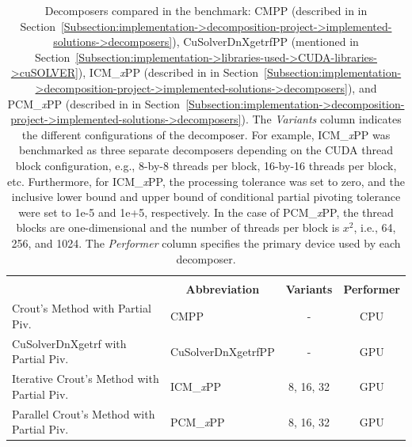 \begin{table}[ht!]
	\centering
	\begin{tabular}{|ll|c|c|}
		\hline
		\rowcolor[HTML]{C0C0C0} 
		\multicolumn{2}{|c|}{\cellcolor[HTML]{C0C0C0}\textbf{Decomposer}} & \cellcolor[HTML]{C0C0C0} & \multicolumn{1}{c|}{\cellcolor[HTML]{C0C0C0}} \\
		\rowcolor[HTML]{EFEFEF} 
		\multicolumn{1}{|c|}{\cellcolor[HTML]{EFEFEF}\textbf{Name}} & \multicolumn{1}{c|}{\cellcolor[HTML]{EFEFEF}\textbf{Abbreviation}} & \multirow{-2}{*}{\cellcolor[HTML]{C0C0C0}\textbf{Variants}} & \multicolumn{1}{c|}{\multirow{-2}{*}{\cellcolor[HTML]{C0C0C0}\textbf{Performer}}} \\ \hline
		\multicolumn{1}{|l|}{Crout's Method with Partial Piv.}           & CMPP               &     -     & CPU \\
		\multicolumn{1}{|l|}{CuSolverDnXgetrf with Partial Piv.}         & CuSolverDnXgetrfPP &     -     & GPU \\
		\multicolumn{1}{|l|}{Iterative Crout's Method with Partial Piv.} & ICM\_\textit{x}PP  & 8, 16, 32 & GPU \\
		\multicolumn{1}{|l|}{Parallel Crout's Method with Partial Piv.}  & PCM\_\textit{x}PP  & 8, 16, 32 & GPU \\ \hline
	\end{tabular}
	\caption{Decomposers compared in the benchmark: CMPP (described in  in Section~\ref{Subsection:implementation->decomposition-project->implemented-solutions->decomposers}), CuSolverDnXgetrfPP (mentioned in Section~\ref{Subsection:implementation->libraries-used->CUDA-libraries->cuSOLVER}), ICM\_\textit{x}PP (described in  in Section~\ref{Subsection:implementation->decomposition-project->implemented-solutions->decomposers}), and PCM\_\textit{x}PP (described in  in Section~\ref{Subsection:implementation->decomposition-project->implemented-solutions->decomposers}). The \textit{Variants} column indicates the different configurations of the decomposer. For example, ICM\_\textit{x}PP was benchmarked as three separate decomposers depending on the CUDA thread block configuration, e.g., 8-by-8 threads per block, 16-by-16 threads per block, etc. Furthermore, for ICM\_\textit{x}PP, the processing tolerance was set to zero, and the inclusive lower bound and upper bound of conditional partial pivoting tolerance were set to 1e-5 and 1e+5, respectively. In the case of PCM\_\textit{x}PP, the thread blocks are one-dimensional and the number of threads per block is $x^2$, i.e., 64, 256, and 1024. The \textit{Performer} column specifies the primary device used by each decomposer.}
	\label{Table:comparing-decomposers-and-solvers->decomposition-project-benchmarks->decomposers-benchmark->table-of-decomposers}
\end{table}

